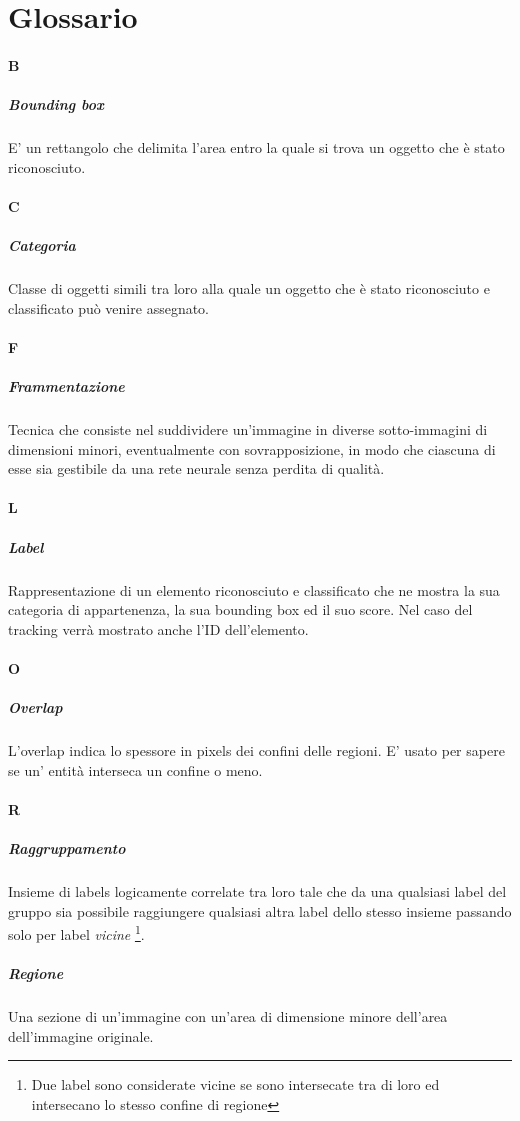 \section{Glossario}

\paragraph{B}
\subparagraph{Bounding box}
E' un rettangolo che delimita l'area entro la quale si trova un oggetto che è stato riconosciuto.

\paragraph{C}
\subparagraph{Categoria}
Classe di oggetti simili tra loro alla quale un oggetto che è stato riconosciuto e classificato può venire assegnato.

\paragraph{F}
\subparagraph{Frammentazione}
Tecnica che consiste nel suddividere un'immagine in diverse sotto-immagini di dimensioni minori, eventualmente con sovrapposizione, in modo che ciascuna di esse sia gestibile da una rete neurale senza perdita di qualità. 

\paragraph{L}
\subparagraph{Label}
Rappresentazione di un elemento riconosciuto e classificato che ne mostra la sua categoria di appartenenza, la sua bounding box ed il suo score. Nel caso del tracking verrà mostrato anche l'ID dell'elemento.

\paragraph{O}
\subparagraph{Overlap}
L'overlap indica lo spessore in pixels dei confini delle regioni. E' usato per sapere se un' entità interseca un confine o meno.

\paragraph{R}
\subparagraph{Raggruppamento}
Insieme di labels logicamente correlate tra loro tale che da una qualsiasi label del gruppo sia possibile raggiungere qualsiasi altra label dello stesso insieme passando solo per label \textit{vicine} \footnote{Due label sono considerate vicine se sono intersecate tra di loro ed intersecano lo stesso confine di regione}.
\subparagraph{Regione} 
Una sezione di un'immagine con un'area di dimensione minore dell'area dell'immagine originale.

